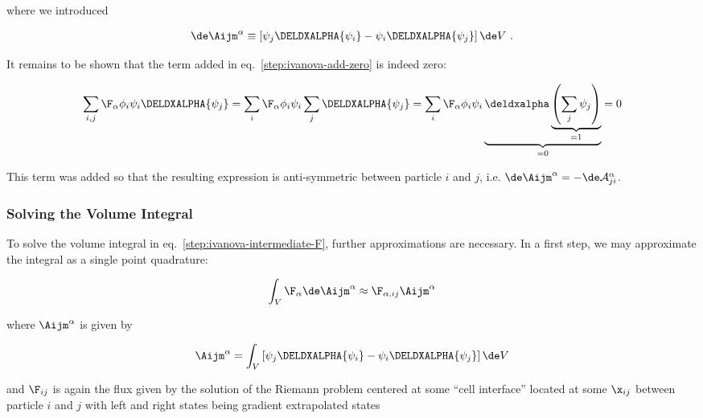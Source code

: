 where we introduced

\begin{align}
\de \Aijm^\alpha \equiv
    \left[ \psi_j \DELDXALPHA{\psi_i} - \psi_i \DELDXALPHA{\psi_j} \right] \de V \ .
\end{align}


It remains to be shown that the term added in eq.~\ref{step:ivanova-add-zero} is indeed zero:

\begin{align}
\sum_{i,j} \F_\alpha \phi_i \psi_i \DELDXALPHA{\psi_j} =
\sum_{i} \F_\alpha \phi_i \psi_i \sum_j \DELDXALPHA{\psi_j} =
\sum_{i} \F_\alpha \phi_i \psi_i
    \underbrace{\deldxalpha
        \underbrace{\left(\sum_j \psi_j \right)}_{= 1}
    }_{= 0} = 0
\end{align}

This term was added so that the resulting expression is anti-symmetric between particle $i$ and $j$, i.e. $\de \Aijm^\alpha = - \de \mathcal{A}_{ji}^\alpha$.









\subsubsection{Solving the Volume Integral}

To solve the volume integral in eq.~\ref{step:ivanova-intermediate-F}, further approximations are
necessary. In a first step, we may approximate the integral as a single point quadrature:

\begin{align}
    \int_V \F_\alpha \de \Aijm^\alpha \approx \F_{\alpha, ij} \Aijm^\alpha
\end{align}

where $\Aijm^\alpha$ is given by

\begin{align}
    \Aijm^\alpha = \int_V
    \left[ \psi_j \DELDXALPHA{\psi_i} - \psi_i \DELDXALPHA{\psi_j} \right] \de V
    \label{eq:IvanovaAij-analytical}
\end{align}

and $\F_{ij}$ is again the flux given by the solution of the Riemann problem centered at some
``cell interface'' located at some $\x_{ij}$ between particle $i$ and $j$ with left and right
states being gradient extrapolated states

